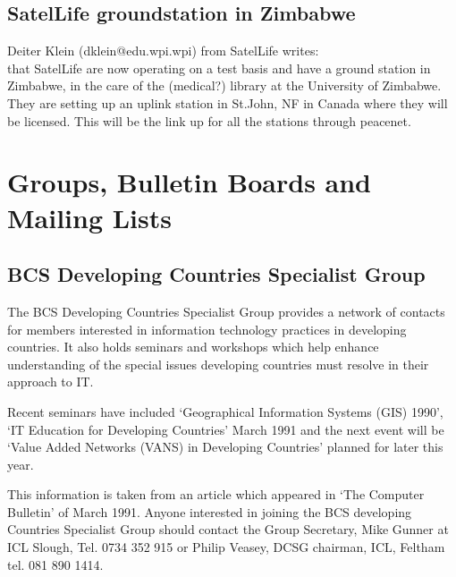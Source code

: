 \subsection{SatelLife groundstation in Zimbabwe}
Deiter Klein (dklein@edu.wpi.wpi) from SatelLife writes:\\
that SatelLife are now operating on a test basis and have a ground station
in Zimbabwe, in the care of the (medical?) library at the University
of Zimbabwe. They are setting up an uplink station in St.John, NF in
Canada where they will be licensed.  This will be the link up for all
the stations through peacenet. 

\section{Groups, Bulletin Boards and Mailing Lists}
\subsection{BCS Developing Countries Specialist Group}
The BCS Developing Countries Specialist Group provides a network of
contacts for members interested in information technology practices in
developing countries. It also holds seminars and workshops which help
enhance understanding of the special issues developing countries must
resolve in their approach to IT.

Recent seminars have included `Geographical Information Systems (GIS)
1990', `IT Education for Developing Countries' March 1991 and the next
event will be `Value Added Networks (VANS) in Developing Countries'
planned for later this year.

This information is taken from an article which appeared in `The
Computer Bulletin' of March 1991. 
Anyone interested in joining the BCS developing Countries Specialist
Group should contact the Group Secretary, Mike Gunner at ICL Slough,
Tel. 0734 352 915 or Philip Veasey, DCSG chairman, ICL, Feltham tel.
081 890 1414.


